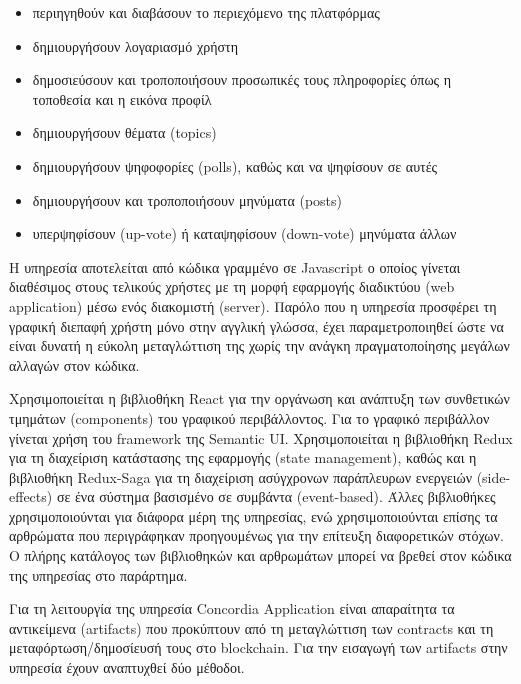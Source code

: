 \begin{itemize}
    \item περιηγηθούν και διαβάσουν το περιεχόμενο της πλατφόρμας

    \item δημιουργήσουν λογαριασμό χρήστη

    \item δημοσιεύσουν και τροποποιήσουν προσωπικές τους πληροφορίες όπως η τοποθεσία και η εικόνα προφίλ

    \item δημιουργήσουν θέματα (topics)

    \item δημιουργήσουν ψηφοφορίες (polls), καθώς και να ψηφίσουν σε αυτές

    \item δημιουργήσουν και τροποποιήσουν μηνύματα (posts)

    \item υπερψηφίσουν (up-vote) ή καταψηφίσουν (down-vote) μηνύματα άλλων
\end{itemize}

Η υπηρεσία αποτελείται από κώδικα γραμμένο σε Javascript ο οποίος γίνεται διαθέσιμος στους τελικούς χρήστες με τη μορφή εφαρμογής διαδικτύου (web application) μέσω ενός διακομιστή (server). Παρόλο που η υπηρεσία προσφέρει τη γραφική διεπαφή χρήστη μόνο στην αγγλική γλώσσα, έχει παραμετροποιηθεί ώστε να είναι δυνατή η εύκολη μεταγλώττιση της χωρίς την ανάγκη πραγματοποίησης μεγάλων αλλαγών στον κώδικα.

Χρησιμοποιείται η βιβλιοθήκη React για την οργάνωση και ανάπτυξη των συνθετικών τμημάτων (components) του γραφικού περιβάλλοντος. Για το γραφικό περιβάλλον γίνεται χρήση του framework της Semantic UI. Χρησιμοποιείται η βιβλιοθήκη Redux για τη διαχείριση κατάστασης της εφαρμογής (state management), %
καθώς και η βιβλιοθήκη Redux-Saga για τη διαχείριση ασύγχρονων παράπλευρων ενεργειών (side-effects) σε ένα σύστημα βασισμένο σε συμβάντα (event-based). Άλλες βιβλιοθήκες χρησιμοποιούνται για διάφορα μέρη της υπηρεσίας, ενώ χρησιμοποιούνται επίσης τα αρθρώματα που περιγράφηκαν προηγουμένως για την επίτευξη διαφορετικών στόχων. Ο πλήρης κατάλογος των βιβλιοθηκών και αρθρωμάτων μπορεί να βρεθεί στον κώδικα της υπηρεσίας στο παράρτημα. %

Για τη λειτουργία της υπηρεσία Concordia Application είναι απαραίτητα τα αντικείμενα (artifacts) που προκύπτουν από τη μεταγλώττιση των contracts και τη μεταφόρτωση/δημοσίευσή τους στο blockchain. Για την εισαγωγή των artifacts στην υπηρεσία έχουν αναπτυχθεί δύο μέθοδοι.

